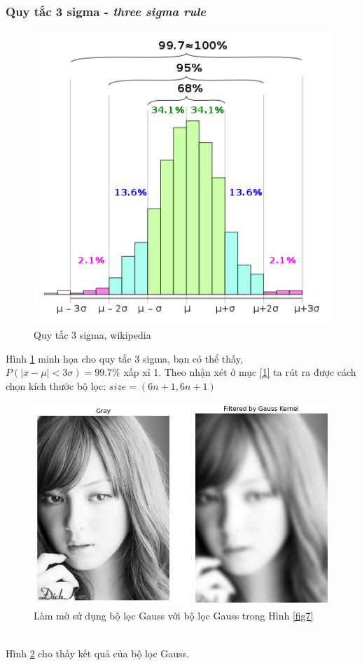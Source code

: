 \documentclass{article}
\begin{document}
    \newpage
    \subsubsection*{{Quy tắc 3 sigma - \textit{three sigma rule}}}
    \begin{figure}[ht!]
        \centering
        \includegraphics[width = 0.7\linewidth]{thre.png}
        \caption{Quy tắc 3 sigma, wikipedia}
        \label{fig8}
    \end{figure} 
    Hình \ref{fig8} minh họa cho quy tắc 3 sigma, bạn có thể thấy, $P(|x-\mu|<3\sigma) = 99.7\% $ xấp xỉ 1. Theo nhận xét ở mục \ref{1} ta rút ra được cách chọn kích thước bộ lọc: $size = (6n+1, 6n+1)$
    \begin{figure}[ht!]
        \includegraphics[width = \linewidth]{download (4).png}
        \caption{Làm mờ sử dụng bộ lọc Gauss với bộ lọc Gauss trong Hình \ref{fig7}}
        \label{fig9}
    \end{figure}  
    \\ Hình \ref{fig9} cho thấy kết quả của bộ lọc Gauss.
\end{document}
